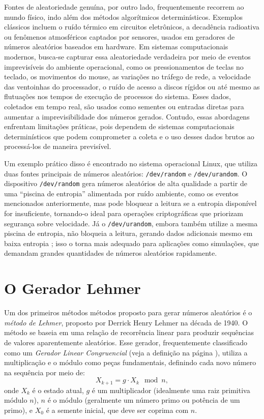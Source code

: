 Fontes de aleatoriedade genuína, por outro lado, frequentemente recorrem ao
mundo físico, indo além dos métodos algorítmicos determinísticos. Exemplos
clássicos incluem o ruído térmico em circuitos eletrônicos, a decadência
radioativa ou fenômenos atmosféricos captados por sensores, usados em geradores
de números aleatórios baseados em hardware. Em sistemas computacionais
modernos, busca-se capturar essa aleatoriedade verdadeira por meio de eventos
imprevisíveis do ambiente operacional, como os pressionamentos de teclas no
teclado, os movimentos do mouse, as variações no tráfego de rede, a velocidade
das ventoinhas do processador, o ruído de acesso a discos rígidos ou até mesmo
as flutuações nos tempos de execução de processos do sistema. Esses dados,
coletados em tempo real, são usados como sementes ou entradas diretas para
aumentar a imprevisibilidade dos números gerados.
Contudo, essas abordagens enfrentam limitações práticas, pois dependem de
sistemas computacionais determinísticos que podem comprometer a coleta e o uso
desses dados brutos ao processá-los de maneira previsível.

Um exemplo prático disso é encontrado no sistema operacional Linux, que utiliza
duas fontes principais de números aleatórios: \texttt{/dev/random} e
\texttt{/dev/urandom}. O dispositivo \texttt{/dev/random} gera números
aleatórios de alta qualidade a partir de uma ``piscina de entropia'' alimentada
por ruído ambiente, como os eventos mencionados anteriormente, mas pode bloquear a leitura se
a entropia disponível for insuficiente, tornando-o ideal para operações
criptográficas que priorizam segurança sobre velocidade. Já o
\texttt{/dev/urandom}, embora também utilize a mesma piscina de entropia, não
bloqueia a leitura, gerando dados adicionais mesmo em baixa entropia \parencite{bansal2023,gutterman2006analysis}; 
isso o torna mais adequado para
aplicações como simulações, que demandam grandes quantidades de números
aleatórios rapidamente.



\section{O Gerador Lehmer}

Um dos primeiros métodos métodos proposto para gerar números aleatórios é o \emph{método de Lehmer},
proposto por Derrick Henry Lehmer na década de 1940. O método se baseia em uma
relação de recorrência linear para produzir sequências de valores aparentemente
aleatórios. Esse gerador, frequentemente classificado como um \emph{Gerador Linear
Congruencial} (veja a definição na página \pageref{itm:LCG}), utiliza a multiplicação e o módulo como peças fundamentais, definindo
cada novo número na sequência por meio de:
\begin{equation}
  X_{k+1} = g \cdot X_k \mod n ,
\end{equation}
onde $X_k$ é o estado atual, $g$ é um multiplicador (idealmente uma raiz primitiva módulo $n$),
$n$ é o módulo (geralmente um número primo ou potência de um primo), e $X_0$ é a semente inicial,
que deve ser coprima com $n$. 

